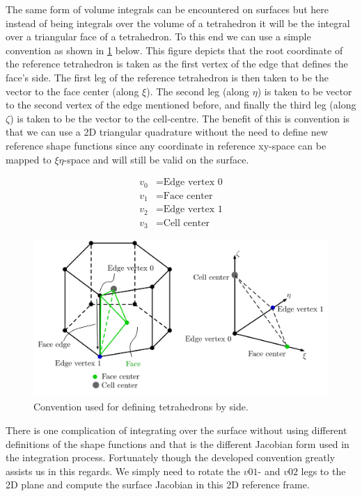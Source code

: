 \documentclass[11pt,letterpaper,titlepage]{article}
\newcommand{\beq}{\begin{equation*}
\begin{aligned}}
\newcommand{\eeq}{\end{aligned}
\end{equation*}}
\begin{document}
\vspace{0.5cm}
The same form of volume integrals can be encountered on surfaces but here instead of being integrals over the volume of a tetrahedron it will be the integral over a triangular face of a tetrahedron. To this end we can use a simple convention as shown in \ref{fig:surfaceintegral} below. This figure depicts that the root coordinate of the reference tetrahedron is taken as the first vertex of the edge that defines the face's side. The first leg of the reference tetrahedron is then taken to be the vector to the face center (along $\xi$). The second leg (along $\eta$) is taken to be vector to the second vertex of the edge mentioned before, and finally the third leg (along $\zeta$) is taken to be the vector to the cell-centre. The benefit of this is convention is that we can use a 2D triangular quadrature without the need to define new reference shape functions since any coordinate in reference xy-space can be mapped to $\xi \eta$-space and will still be valid on the surface.

\beq 
v_0 &= \text{Edge vertex 0} \\
v_1 &= \text{Face center} \\
v_2 &= \text{Edge vertex 1} \\
v_3 &= \text{Cell center}
\eeq 

\vspace{0.25cm}
\begin{figure}[H]
\centering
\includegraphics[width=0.8\linewidth]{LatexDraw/SurfaceIntegral}
\caption{Convention used for defining tetrahedrons by side.}
\label{fig:surfaceintegral}
\end{figure}

There is one complication of integrating over the surface without using different definitions of the shape functions and that is the different Jacobian form used in the integration process. Fortunately though the developed convention greatly assists us in this regards. We simply need to rotate the $v01$- and $v02$ legs to the 2D plane and compute the surface Jacobian in this 2D reference frame. 
\end{document}
